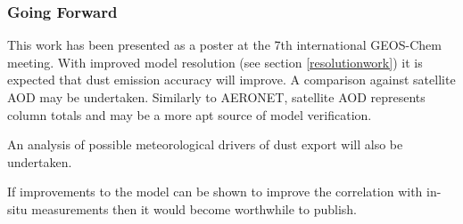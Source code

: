 \subsubsection{Going Forward}

This work has been presented as a poster at the 7th international GEOS-Chem meeting.
With improved model resolution (see section \ref{resolutionwork}) it is expected that dust emission accuracy will improve.
A comparison against satellite AOD may be undertaken.
Similarly to AERONET, satellite AOD represents column totals and may be a more apt source of model verification.

An analysis of possible meteorological drivers of dust export will also be undertaken.

If improvements to the model can be shown to improve the correlation with in-situ measurements then it would become worthwhile to publish.